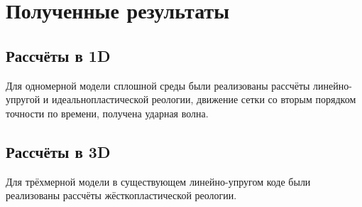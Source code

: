 \section{Полученные результаты}
\subsection{Рассчёты в 1D}
Для одномерной модели сплошной среды были реализованы рассчёты линейно-упругой и идеальнопластической реологии, движение сетки со вторым порядком точности по времени, получена ударная волна.
\subsection{Рассчёты в 3D}
Для трёхмерной модели в существующем линейно-упругом коде были реализованы рассчёты жёсткопластической реологии.